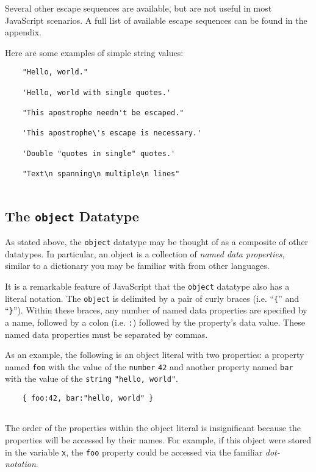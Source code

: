 \documentclass[11pt,letter]{book}
\begin{document}
    Several other escape sequences are available, but are not useful in most JavaScript scenarios. 
    A full list of available escape sequences can be found in the appendix.
    
    Here are some examples of simple string values:
    
    \begin{verbatim}
    "Hello, world."
    
    'Hello, world with single quotes.'
    
    "This apostrophe needn't be escaped."
    
    'This apostrophe\'s escape is necessary.'
    
    'Double "quotes in single" quotes.'
    
    "Text\n spanning\n multiple\n lines"
    
    \end{verbatim}
    
    \subsection{The \texttt{object} Datatype}
    
    As stated above, the \texttt{object} datatype may be thought of as a composite of other 
    datatypes. In particular, an object is a collection of \emph{named data properties}, similar
    to a dictionary you may be familiar with from other languages.
    
    It is a remarkable feature of JavaScript that the \texttt{object} datatype also has a literal
    notation. The \texttt{object} is delimited by a pair of curly braces (i.e. ``\texttt{\{}'' and 
    ``\texttt{\}}''). Within these braces, any number of named data properties are specified by a 
    name, followed by a colon (i.e. \texttt{:}) followed by the property's data value. These named 
    data properties must be separated by commas.
    
    As an example, the following is an object literal with two properties: a property named 
    \texttt{foo} with the value of the \texttt{number} \texttt{42} and another property named 
    \texttt{bar} with the value of the \texttt{string} \texttt{"hello, world"}.
    
    \begin{verbatim}
    { foo:42, bar:"hello, world" }
    
    \end{verbatim}
    
    The order of the properties within the object literal is insignificant because the properties
    will be accessed by their names. For example, if this object were stored in the variable 
    \texttt{x}, the \texttt{foo} property could be accessed via the familiar \emph{dot-notation}.
    
\end{document}
